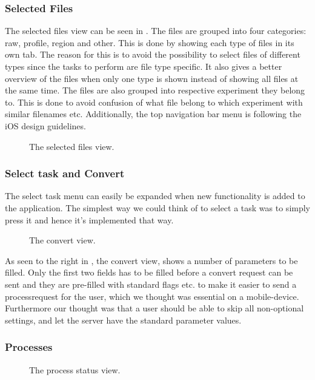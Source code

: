 \subsubsection{Selected Files}
The selected files view can be seen in . The files are grouped into four categories: raw, profile, region and other. This is done by showing each type of files in its own tab. The reason for this is to avoid the possibility to select files of different types since the tasks to perform are file type specific. It also gives a better overview of the files when only one type is shown instead of showing all files at the same time. The files are also grouped into respective experiment they belong to. This is done to avoid confusion of what file belong to which experiment with similar filenames etc. Additionally, the top navigation bar menu is following the iOS design guidelines.

\begin{figure}[ht]
\caption{The selected files view.}
\label{fig:ios_selectedFiles2}
\end{figure}
\FloatBarrier

\subsubsection{Select task and Convert}
The select task menu can easily be expanded when new functionality is added to the application. The simplest way we could think of to select a task was to simply press it and hence it's implemented that way.
\begin{figure}[ht]
\caption{The convert view.}
\label{fig:ios_convertParameters}
\end{figure}
\FloatBarrier

As seen to the right in , the convert view, shows a number of parameters to be filled. Only the first two fields has to be filled before a convert request can be sent and they are pre-filled with standard flags etc. to make it easier to send a processrequest for the user, which we thought was essential on a mobile-device. Furthermore our thought was that a user should be able to skip all non-optional settings, and let the server have the standard parameter values. 


\subsubsection{Processes}
\begin{figure}[ht]
\caption{The process status view.}
\label{fig:ios_processingStatus}
\end{figure}
\FloatBarrier

